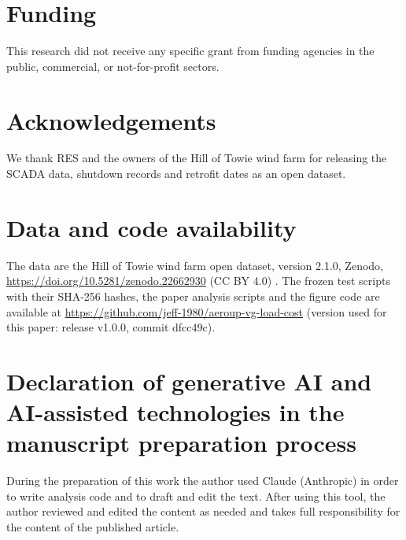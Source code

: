 \documentclass[preprint,12pt]{elsarticle}
\begin{document}
\section*{Funding}

This research did not receive any specific grant from funding agencies in the public, commercial, or not-for-profit sectors.

\section*{Acknowledgements}

We thank RES and the owners of the Hill of Towie wind farm for releasing the SCADA data, shutdown records and retrofit dates as an open dataset.

\section*{Data and code availability}

The data are the Hill of Towie wind farm open dataset, version 2.1.0, Zenodo, \url{https://doi.org/10.5281/zenodo.22662930} (CC BY 4.0) \cite{hot}. The frozen test scripts with their SHA-256 hashes, the paper analysis scripts and the figure code are available at \url{https://github.com/jeff-1980/aeroup-vg-load-cost} (version used for this paper: release v1.0.0, commit dfcc49c).

\section*{Declaration of generative AI and AI-assisted technologies in the manuscript preparation process}

During the preparation of this work the author used Claude (Anthropic) in order to write analysis code and to draft and edit the text. After using this tool, the author reviewed and edited the content as needed and takes full responsibility for the content of the published article.
\end{document}
